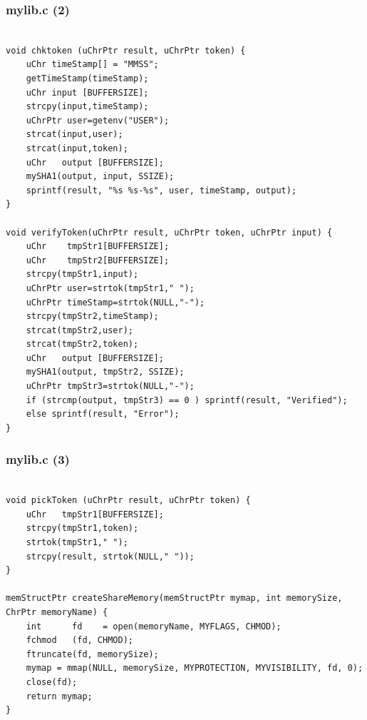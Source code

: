 \documentclass[xcolor=table, notheorems, hyperref={pdfpagelabels=false}]{beamer}
\begin{document}
\begin{frame}[fragile]
\frametitle{mylib.c (2)}
\begin{lstlisting}[basicstyle=\ttfamily\tiny]         % 108

void chktoken (uChrPtr result, uChrPtr token) {
    uChr timeStamp[] = "MMSS";
    getTimeStamp(timeStamp);
    uChr input [BUFFERSIZE];
    strcpy(input,timeStamp);
    uChrPtr user=getenv("USER");
    strcat(input,user);
    strcat(input,token);
    uChr   output [BUFFERSIZE];
    mySHA1(output, input, SSIZE);
    sprintf(result, "%s %s-%s", user, timeStamp, output);
}

void verifyToken(uChrPtr result, uChrPtr token, uChrPtr input) {
    uChr    tmpStr1[BUFFERSIZE];
    uChr    tmpStr2[BUFFERSIZE];
    strcpy(tmpStr1,input);
    uChrPtr user=strtok(tmpStr1," ");
    uChrPtr timeStamp=strtok(NULL,"-");
    strcpy(tmpStr2,timeStamp);
    strcat(tmpStr2,user);
    strcat(tmpStr2,token);
    uChr   output [BUFFERSIZE];
    mySHA1(output, tmpStr2, SSIZE);
    uChrPtr tmpStr3=strtok(NULL,"-");
    if (strcmp(output, tmpStr3) == 0 ) sprintf(result, "Verified");
    else sprintf(result, "Error");
}

\end{lstlisting}
\end{frame}

\begin{frame}[fragile]
\frametitle{mylib.c (3)}
\begin{lstlisting}[basicstyle=\ttfamily\tiny]         % 108

void pickToken (uChrPtr result, uChrPtr token) {
    uChr   tmpStr1[BUFFERSIZE];
    strcpy(tmpStr1,token);
    strtok(tmpStr1," ");
    strcpy(result, strtok(NULL," "));
}

memStructPtr createShareMemory(memStructPtr mymap, int memorySize, ChrPtr memoryName) {
    int      fd    = open(memoryName, MYFLAGS, CHMOD);
    fchmod   (fd, CHMOD);
    ftruncate(fd, memorySize);
    mymap = mmap(NULL, memorySize, MYPROTECTION, MYVISIBILITY, fd, 0);
    close(fd);
    return mymap;
}

\end{lstlisting}
\end{frame}
\end{document}
